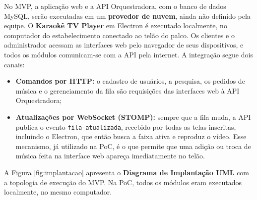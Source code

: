 No MVP, a aplicação web e a API Orquestradora, com o banco de dados MySQL, serão executadas em um \textbf{provedor de nuvem}, ainda não definido pela equipe. O \textbf{Karaokê TV Player} em Electron é executado localmente, no computador do estabelecimento conectado ao telão do palco. Os clientes e o administrador acessam as interfaces web pelo navegador de seus dispositivos, e todos os módulos comunicam-se com a API pela internet. A integração segue dois canais:

\begin{itemize}
  \item \textbf{Comandos por HTTP:} o cadastro de usuários, a pesquisa, os pedidos de música e o gerenciamento da fila são requisições das interfaces web à API Orquestradora;
  \item \textbf{Atualizações por WebSocket (STOMP):} sempre que a fila muda, a API publica o evento \texttt{fila-atualizada}, recebido por todas as telas inscritas, incluindo o Electron, que então busca a faixa ativa e reproduz o vídeo. Esse mecanismo, já utilizado na PoC, é o que permite que uma adição ou troca de música feita na interface web apareça imediatamente no telão.
\end{itemize}

A Figura \ref{fig:implantacao} apresenta o \textbf{Diagrama de Implantação UML} com a topologia de execução do MVP. Na PoC, todos os módulos eram executados localmente, no mesmo computador.

